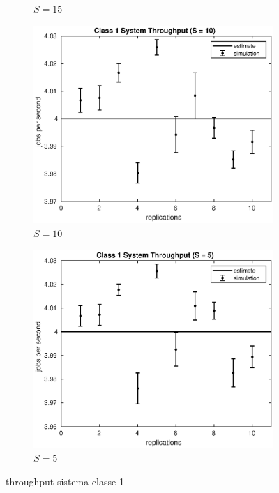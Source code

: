 \begin{figure}[!h]
\begin{subfigure}[t]{0.49\textwidth}
\caption{$S = 15$}
\label{15_x1}
\end{subfigure}
%
\begin{subfigure}[t]{0.49\textwidth}
\includegraphics[width=\textwidth]{figures/simul/10_500K_x1}
\caption{$S = 10$}
\label{10_x1}
\end{subfigure}
%
\begin{subfigure}[t]{0.49\textwidth}
\includegraphics[width=\textwidth]{figures/simul/5_500K_x1}
\caption{$S = 5$}
\label{5_x1}
\end{subfigure}
%
\caption{throughput sistema classe 1}
\label{plot:x1}
\end{figure}
